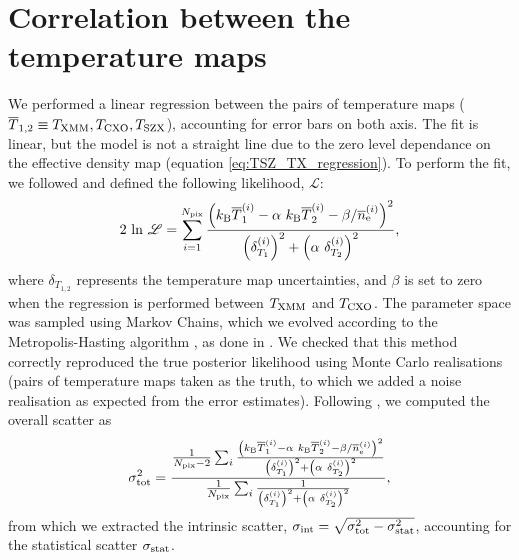 \documentclass[twocolumn,traditabstract]{aa}
\newcommand{\ccor}[1]{\textcolor{Mypink}{#1}}
\def\TSZ {T_{\rm SZX}}
\def \TXC {T_{\rm CXO}}
\def \TXX {T_{\rm XMM}}
\begin{document}
\section{Correlation between the temperature maps}\label{append:correlation}
\ccor{We performed a linear regression between the pairs of temperature maps ($\overline{T}_{1,2} \equiv \TXX, \TXC, \TSZ$), accounting for error bars on both axis. The fit is linear, but the model is not a straight line due to the zero level dependance on the effective density map (equation \ref{eq:TSZ_TX_regression}). To perform the fit, we followed \cite{Orear1982} and defined the following likelihood, $\mathscr{L}$:
\begin{equation}
2 \ {\rm ln} \ \mathscr{L} = \sum_{i=1}^{N_{\rm pix}} \frac{\left(k_{\rm B} \overline{T}^{(i)}_{1} - \alpha \ k_{\rm B} \overline{T}^{(i)}_{2} - {\beta}/{\overline{n}_{\rm e}^{(i)}}\right)^2}{\left(\delta^{(i)}_{T_{1}}\right)^2 + \left(\alpha \ \delta^{(i)}_{T_{2}}\right)^2},
\label{eq:chi2_def}
\end{equation}
where $\delta_{T_{1,2}}$ represents the temperature map uncertainties, and $\beta$ is set to zero when the regression is performed between $\TXX$ and $\TXC$. The parameter space was sampled using Markov Chains, which we evolved according to the Metropolis-Hasting algorithm \citep{Chib1995}, as done in \cite{Adam2015}. We checked that this method correctly reproduced the true posterior likelihood using Monte Carlo realisations (pairs of temperature maps taken as the truth, to which we added a noise realisation as expected from the error estimates). Following \citep{Pratt2009}, we computed the overall scatter as
\begin{equation}
\sigma_{\rm tot}^2 = \frac{\frac{1}{N_{\rm pix} - 2} \sum_i \frac{\left(k_{\rm B} \overline{T}^{(i)}_{1} - \alpha \ k_{\rm B} \overline{T}^{(i)}_{2} - {\beta}/{\overline{n}_{\rm e}^{(i)}}\right)^2}{\left(\delta^{(i)}_{T_{1}}\right)^2 + \left(\alpha \ \delta^{(i)}_{T_{2}}\right)^2}}{\frac{1}{N_{\rm pix}} \sum_i \frac{1}{\left(\delta^{(i)}_{T_{1}}\right)^2 + \left(\alpha \ \delta^{(i)}_{T_{2}}\right)^2}},
\label{eq:scatter_def}
\end{equation}
from which we extracted the intrinsic scatter, $\sigma_{\rm int} = \sqrt{\sigma_{\rm tot}^2 - \sigma_{\rm stat}^2}$, accounting for the statistical scatter $\sigma_{\rm stat}$.}
\end{document}
